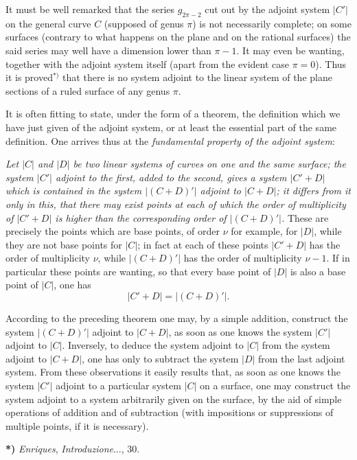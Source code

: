 \documentclass{article}
\begin{document}
It must be well remarked that the series $g_{2\pi-2}$ cut out by the adjoint system $|C'|$ on the general curve $C$ (supposed of genus $\pi$) is not necessarily complete; on some surfaces (contrary to what happens on the plane and on the rational surfaces) the said series may well have a dimension lower than $\pi - 1$. It may even be wanting, together with the adjoint system itself (apart from the evident case $\pi = 0$). Thus it is proved${}^{*)}$ that there is no system adjoint to the linear system of the plane sections of a ruled surface of any genus $\pi$.

It is often fitting to state, under the form of a theorem, the definition which we have just given of the adjoint system, or at least the essential part of the same definition. One arrives thus at the \emph{fundamental property of the adjoint system}:

\emph{Let $|C|$ and $|D|$ be two linear systems of curves on one and the same surface; the system $|C'|$ adjoint to the first, added to the second, gives a system $|C' + D|$ which is contained in the system $|(C + D)'|$ adjoint to $|C + D|$; it differs from it only in this, that there may exist points at each of which the order of multiplicity of $|C' + D|$ is higher than the corresponding order of $|(C + D)'|$.} These are precisely the points which are base points, of order $\nu$ for example, for $|D|$, while they are not base points for $|C|$; in fact at each of these points $|C' + D|$ has the order of multiplicity $\nu$, while $|(C + D)'|$ has the order of multiplicity $\nu - 1$. If in particular these points are wanting, so that every base point of $|D|$ is also a base point of $|C|$, one has
\[
|C' + D| = |(C + D)'|.
\]

According to the preceding theorem one may, by a simple addition, construct the system $|(C + D)'|$ adjoint to $|C + D|$, as soon as one knows the system $|C'|$ adjoint to $|C|$. Inversely, to deduce the system adjoint to $|C|$ from the system adjoint to $|C + D|$, one has only to subtract the system $|D|$ from the last adjoint system. From these observations it easily results that, as soon as one knows the system $|C'|$ adjoint to a particular system $|C|$ on a surface, one may construct the system adjoint to a system arbitrarily given on the surface, by the aid of simple operations of addition and of subtraction (with impositions or suppressions of multiple points, if it is necessary).

\textbf{*)} \emph{Enriques}, \emph{Introduzione}..., 30.
\end{document}
